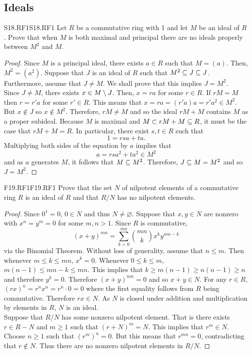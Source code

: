 \documentclass[../../AlgebraQualSolutions.tex]{subfiles}
\begin{document}
\subsection{Ideals}

	\begin{prob}{S18.RF1}{S18.RF1}
		Let $R$ be a commutative ring with 1 and let $M$ be an ideal of $R$. Prove that when $M$ is both maximal and principal there are no ideals properly between $M^2$ and $M$.
	\end{prob}

	\begin{proof}
		Since $M$ is a principal ideal, there exists $a \in R$ such that $M = (a)$. Then, $M^2 = (a^2)$. Suppose that $J$ is an ideal of $R$ such that $M^2 \subseteq J \subseteq J$. Furthermore, assume that $J \neq M$. We shall prove that this implies $J = M^2$.\\

		Since $J \neq M$, there exists $x \in M \setminus J$. Then, $x = ra$ for some $r \in R$. If $rM = M$ then $r = r'a$ for some $r' \in R$. This means that $x = ra = (r'a)a = r'a^2 \in M^2$. But $x \not\in J$ so $x \not\in M^2$. Therefore, $rM \neq M$ and so the ideal $rM + M$ contains $M$ as a proper subideal. Because $M$ is maximal and $M \subset rM + M \subseteq R$, it must be the case that $rM + M = R$. In particular, there exist $s,t \in R$ such that
			\[1 = rsa + ta.\]
		Multiplying both sides of the equation by $a$ implies that
			\[a = rsa^2 + ta^2 \in M^2\]
		and as $a$ generates $M$, it follows that $M \subseteq M^2$. Therefore, $J \subseteq M = M^2$ and so $J = M^2$.
	\end{proof}

	\begin{prob}{F19.RF1}{F19.RF1}
	Prove that the set $N$ of nilpotent elements of a commutative ring $R$ is an ideal of $R$ and that $R/N$ has no nilpotent elements.
	\end{prob}
	
	\begin{proof}
	Since $0^1 = 0$, $0 \in N$ and thus $N \neq \varnothing$. Suppose that $x,y \in N$ are nonzero with $x^n = y^m = 0$ for some $m,n > 1$. Since $R$ is commutative,
		\[(x+y)^{mn} = \sum_{k=0}^{mn} {mn \choose k} x^k y^{mn - k} \]
	via the Binomial Theorem. Without loss of generality, assume that $n \leq m$. Then whenever $m \leq k \leq mn$, $x^k = 0$. Whenever $0 \leq k \leq m$, $m(n - 1) \leq mn - k \leq mn$. This implies that $k \geq m(n-1) \geq n(n-1) \geq n$ and therefore $y^k = 0$. Therefore $(x+y)^{mn} = 0$ and so $x + y \in N$. For any $r \in R$, $(rx)^n = r^nx^n = r^n \cdot 0 = 0$ where the first equality follows from $R$ being commutative. Therefore $rx \in N$. As $N$ is closed under addition and multiplication by elements in $R$, $N$ is an ideal.\\
	
	Suppose that $R/N$ has some nonzero nilpotent element. That is there exists $r \in R - N$ and $m \geq 1$ such that $(r+N)^m = N$. This implies that $r^m \in N$. Choose $n \geq 1$  such that $(r^m)^n = 0$. But this means that $r^{mn} = 0$, contradicting that $r \not\in N$. Thus there are no nonzero nilpotent elements in $R/N$.
	\end{proof}
\end{document}
